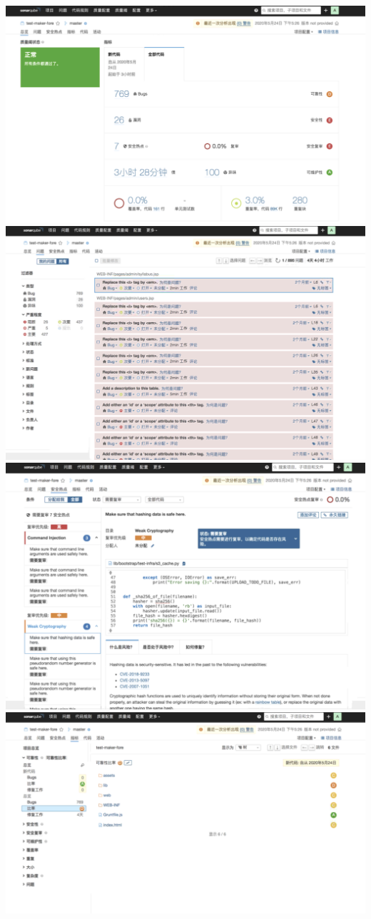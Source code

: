 \documentclass[hyperref, a4paper]{ctexart}
\begin{document}
\includegraphics{screenshots/lab7-pic/fore-1.png}
\includegraphics{screenshots/lab7-pic/fore-2.png}
\includegraphics{screenshots/lab7-pic/fore-3.png}
\includegraphics{screenshots/lab7-pic/fore-5.png}
\end{document}
